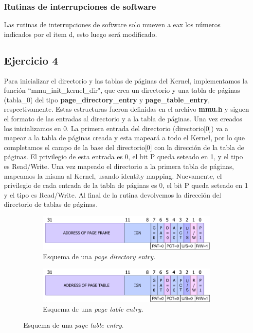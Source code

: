 \documentclass[a4paper]{article}
\begin{document}
\subsubsection{Rutinas de interrupciones de software}
\justify
Las rutinas de interrupciones de software solo mueven a eax los números indicados por el item d, esto luego será modificado.

\subsection{Ejercicio 4}
\justify
Para inicializar el directorio y las tablas de páginas del Kernel, implementamos la función ``mmu_init_kernel_dir", que crea un directorio y una tabla de páginas (tabla_0) del tipo \textbf{page_directory_entry}  y \textbf{page_table_entry}, respectivamente. Estas estructuras fueron definidas en el archivo \textbf{mmu.h} y siguen el formato de las entradas al directorio y a la tabla de páginas. Una vez creados los inicializamos en 0.
\justify
La primera entrada del directorio (directorio[0]) va a mapear a la tabla de páginas creada y esta mapeará a todo el Kernel, por lo que completamos el campo de la base del directorio[0] con la dirección de la tabla de páginas. El privilegio de esta entrada es 0, el bit P queda seteado en 1, y el tipo es Read/Write. Una vez mapeado el directorio a la primera tabla de páginas, mapeamos la misma al Kernel, usando identity mapping. Nuevamente, el privilegio de cada entrada de la tabla de páginas es 0, el bit P queda seteado en 1 y el tipo es Read/Write. Al final de la rutina devolvemos la dirección del directorio de tablas de páginas. 
 
 \begin{figure}[h!]
 	\centering
 	\begin{subfigure}[b]{0.49 \textwidth}
 		\includegraphics[width=\textwidth]{img/pde.pdf}
 		\caption{Esquema de una \textit{page directory entry}.}
 	\end{subfigure}
 	\hfill
 	\begin{subfigure}[b]{0.49 \textwidth}
 		\includegraphics[width=\textwidth]{img/pte.pdf}
 		\caption{Esquema de una \textit{page table entry.}}
 	\end{subfigure}
 \end{figure}
\end{document}
